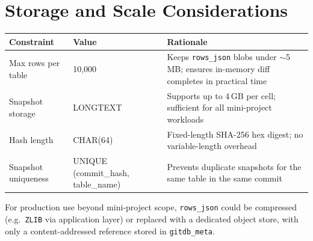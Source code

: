 \documentclass[12pt, a4paper]{article}
\begin{document}
\section{Storage and Scale Considerations}

\begin{center}
\begin{tabular}{l l p{8cm}}
\toprule
\textbf{Constraint} & \textbf{Value} & \textbf{Rationale} \\
\midrule
Max rows per table  & 10,000   & Keeps \texttt{rows\_json} blobs under $\sim$5\,MB; ensures in-memory diff completes in practical time \\
Snapshot storage    & LONGTEXT & Supports up to 4\,GB per cell; sufficient for all mini-project workloads \\
Hash length         & CHAR(64) & Fixed-length SHA-256 hex digest; no variable-length overhead \\
Snapshot uniqueness & UNIQUE (commit\_hash, table\_name) & Prevents duplicate snapshots for the same table in the same commit \\
\bottomrule
\end{tabular}
\end{center}

\medskip
\noindent For production use beyond mini-project scope, \texttt{rows\_json}
could be compressed (e.g.\ \texttt{ZLIB} via application layer) or replaced
with a dedicated object store, with only a content-addressed reference stored
in \texttt{gitdb\_meta}.
\end{document}
